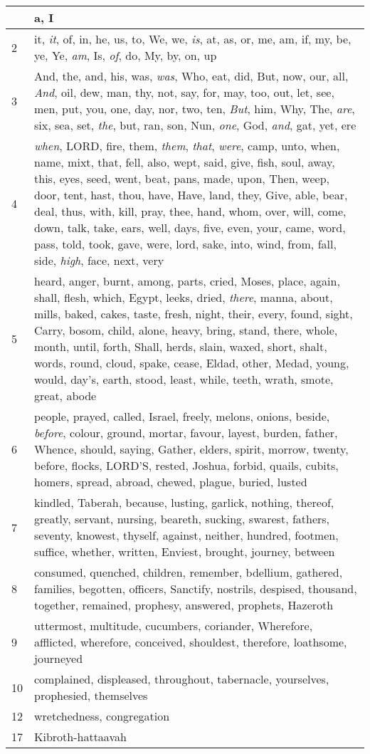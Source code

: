 \begin{longtable}{l|p{3.75in}}
\hline \hline
\endlastfoot
1 & a, I \\ \hline
2 & it, \emph{it}, of, in, he, us, to, We, we, \emph{is}, at, as, or, me, am, if, my, be, ye, Ye, \emph{am}, Is, \emph{of}, do, My, by, on, up \\ \hline
3 & And, the, and, his, was, \emph{was}, Who, eat, did, But, now, our, all, \emph{And}, oil, dew, man, thy, not, say, for, may, too, out, let, see, men, put, you, one, day, nor, two, ten, \emph{But}, him, Why, The, \emph{are}, six, sea, set, \emph{the}, but, ran, son, Nun, \emph{one}, God, \emph{and}, gat, yet, ere \\ \hline
4 & \emph{when}, LORD, fire, them, \emph{them}, \emph{that}, \emph{were}, camp, unto, when, name, mixt, that, fell, also, wept, said, give, fish, soul, away, this, eyes, seed, went, beat, pans, made, upon, Then, weep, door, tent, hast, thou, have, Have, land, they, Give, able, bear, deal, thus, with, kill, pray, thee, hand, whom, over, will, come, down, talk, take, ears, well, days, five, even, your, came, word, pass, told, took, gave, were, lord, sake, into, wind, from, fall, side, \emph{high}, face, next, very \\ \hline
5 & heard, anger, burnt, among, parts, cried, Moses, place, again, shall, flesh, which, Egypt, leeks, dried, \emph{there}, manna, about, mills, baked, cakes, taste, fresh, night, their, every, found, sight, Carry, bosom, child, alone, heavy, bring, stand, there, whole, month, until, forth, Shall, herds, slain, waxed, short, shalt, words, round, cloud, spake, cease, Eldad, other, Medad, young, would, day's, earth, stood, least, while, teeth, wrath, smote, great, abode \\ \hline
6 & people, prayed, called, Israel, freely, melons, onions, beside, \emph{before}, colour, ground, mortar, favour, layest, burden, father, Whence, should, saying, Gather, elders, spirit, morrow, twenty, before, flocks, LORD'S, rested, Joshua, forbid, quails, cubits, homers, spread, abroad, chewed, plague, buried, lusted \\ \hline
7 & kindled, Taberah, because, lusting, garlick, nothing, thereof, greatly, servant, nursing, beareth, sucking, swarest, fathers, seventy, knowest, thyself, against, neither, hundred, footmen, suffice, whether, written, Enviest, brought, journey, between \\ \hline
8 & consumed, quenched, children, remember, bdellium, gathered, families, begotten, officers, Sanctify, nostrils, despised, thousand, together, remained, prophesy, answered, prophets, Hazeroth \\ \hline
9 & uttermost, multitude, cucumbers, coriander, Wherefore, afflicted, wherefore, conceived, shouldest, therefore, loathsome, journeyed \\ \hline
10 & complained, displeased, throughout, tabernacle, yourselves, prophesied, themselves \\ \hline
12 & wretchedness, congregation \\ \hline
17 & Kibroth-hattaavah \\ \hline
\end{longtable}






